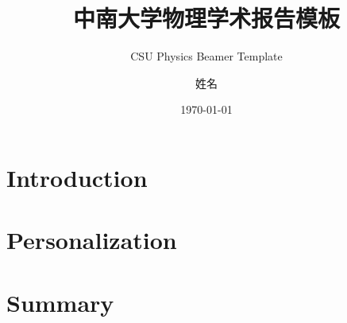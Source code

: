 \documentclass[dvipsnames]{beamer}
\title{中南大学物理学术报告模板}
\subtitle{CSU Physics Beamer Template}
\author{姓名}
\date{\today}
\begin{document}
\maketitle

\section{Introduction}




\section{Personalization}







\footlinecolor{}




\section{Summary}


\backmatter
\end{document}
